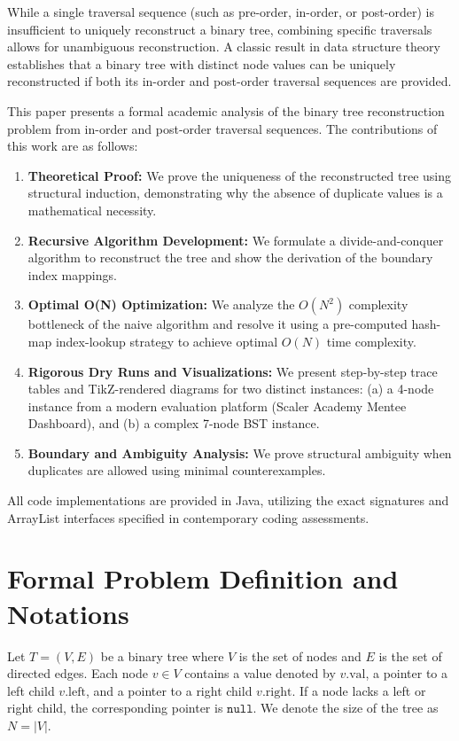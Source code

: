 \documentclass[10pt,journal,compsoc,onecolumn]{IEEEtran}
\begin{document}
While a single traversal sequence (such as pre-order, in-order, or post-order) is insufficient to uniquely reconstruct a binary tree, combining specific traversals allows for unambiguous reconstruction. A classic result in data structure theory establishes that a binary tree with distinct node values can be uniquely reconstructed if both its in-order and post-order traversal sequences are provided. 

This paper presents a formal academic analysis of the binary tree reconstruction problem from in-order and post-order traversal sequences. The contributions of this work are as follows:
\begin{enumerate}
    \item \textbf{Theoretical Proof:} We prove the uniqueness of the reconstructed tree using structural induction, demonstrating why the absence of duplicate values is a mathematical necessity.
    \item \textbf{Recursive Algorithm Development:} We formulate a divide-and-conquer algorithm to reconstruct the tree and show the derivation of the boundary index mappings.
    \item \textbf{Optimal O(N) Optimization:} We analyze the $O(N^2)$ complexity bottleneck of the naive algorithm and resolve it using a pre-computed hash-map index-lookup strategy to achieve optimal $O(N)$ time complexity.
    \item \textbf{Rigorous Dry Runs and Visualizations:} We present step-by-step trace tables and TikZ-rendered diagrams for two distinct instances: (a) a 4-node instance from a modern evaluation platform (Scaler Academy Mentee Dashboard), and (b) a complex 7-node BST instance.
    \item \textbf{Boundary and Ambiguity Analysis:} We prove structural ambiguity when duplicates are allowed using minimal counterexamples.
\end{enumerate}

All code implementations are provided in Java, utilizing the exact signatures and ArrayList interfaces specified in contemporary coding assessments.

\section{Formal Problem Definition and Notations}
\label{sec:definitions}

Let $T = (V, E)$ be a binary tree where $V$ is the set of nodes and $E$ is the set of directed edges. Each node $v \in V$ contains a value denoted by $v.\text{val}$, a pointer to a left child $v.\text{left}$, and a pointer to a right child $v.\text{right}$. If a node lacks a left or right child, the corresponding pointer is $\texttt{null}$. We denote the size of the tree as $N = |V|$.
\end{document}
